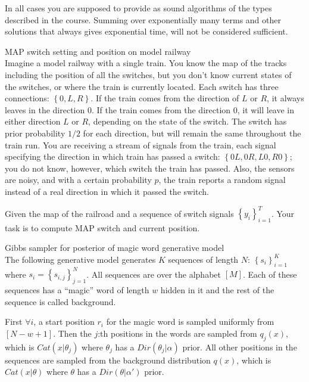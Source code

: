 \documentclass[a4paper,twoside=false,abstract=false,numbers=noenddot,
titlepage=false,headings=small,parskip=half,version=last]{scrartcl}
\begin{document}
In all cases you are supposed to provide as sound algorithms of the types
described in the course.
Summing over exponentially many terms and other
solutions that always gives exponential time, will not be considered
sufficient.
\begin{exercise}{2} MAP switch setting and position on model railway \\ 
    Imagine a model railway with a single train. You know the map of the tracks
    including the position of all the switches, but you don't know current states
    of the switches, or where the train is currently located. Each switch has three
    connections: $\left\{0,L,R\right\}$. If the train comes from the direction of
    $L$ or $R$, it always
    leaves in the direction $0$. If the train comes from the direction $0$, it will
    leave in either direction $L$ or $R$, depending on the state of the switch. The
    switch has prior probability $1/2$ for each direction, but will remain the same
    throughout the train run. You are receiving a stream of signals from the train,
    each signal specifying the direction in which train has passed a switch: 
    $\left\{0L,0R,L0,R0\right\}$; you do not know, however, 
    which switch the train has passed.
    Also, the sensors are noisy, and with a certain probability $p$, the train
    reports a random signal instead of a real direction in which it passed the
    switch.

    Given the map of the railroad and a sequence of switch signals
    $\left\{ y_i \right\}_{i=1}^T$. Your task is to compute MAP switch and current
    position.
\end{exercise}
\begin{solution}
    
\end{solution}

\begin{exercise}{3}Gibbs sampler for posterior of magic word generative model\\
    The following generative model generates $K$ sequences of length $N$:
    $\left\{s_i\right\}_{i=1}^K$ where $s_i=\left\{s_{i,j}\right\}_{j=1}^N$.
    All sequences are over the alphabet $\left[M\right]$. Each of these
    sequences has a ``magic'' word of length $w$ hidden in it and the rest of
    the sequence is called background.

    First $\forall i$, a start position $r_i$ for the magic word is sampled
    uniformly from $\left[N-w+1\right]$. Then the $j$:th positions in the words
    are sampled from $q_j(x)$, which is $Cat\left(x|\theta_j\right)$ where 
    $\theta_j$ has a $Dir\left(\theta_j|\alpha\right)$ prior. All other
    positions in the sequences are sampled from the background distribution
    $q(x)$, which is $Cat\left(x|\theta\right)$ where $\theta$ has a
    $Dir\left(\theta|\alpha'\right)$ prior.
\end{exercise}
\begin{solution}
    
\end{solution}
\end{document}
